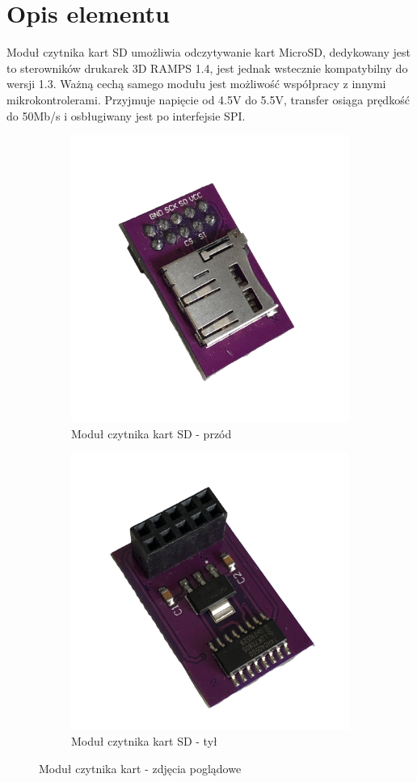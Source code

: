 \documentclass[11pt, a4paper]{article}
\author{Dawid Wasung}
\institute{Instytut Robotyki i Inteligencji Maszynowej}
\begin{document}
\newpage

\section*{Opis elementu} 
Moduł czytnika kart SD umożliwia odczytywanie kart MicroSD, dedykowany jest to sterowników drukarek 3D RAMPS 1.4, jest jednak wstecznie kompatybilny do wersji 1.3. Ważną cechą samego modułu jest możliwość współpracy z innymi mikrokontrolerami. Przyjmuje napięcie od 4.5V do 5.5V, transfer osiąga prędkość do 50Mb/s i osbługiwany jest po interfejsie SPI.
\vspace{0.5cm}
\begin{figure}[h!]
\centering
\begin{subfigure}{.5\textwidth}
  \centering
  \includegraphics[width=.72\linewidth]{fig/KY-018/zdj_modułu/front.png}
  \caption{Moduł czytnika kart SD - przód}
  \label{fig:sub1}
\end{subfigure}%
\begin{subfigure}{.5\textwidth}
  \centering
  \includegraphics[width=0.748\linewidth]{fig/KY-018/zdj_modułu/back.png}
  \caption{Moduł czytnika kart SD - tył}
  \label{fig:sub2}
\end{subfigure}
\caption{Moduł czytnika kart - zdjęcia poglądowe}
\label{fig:test}
\end{figure}
\end{document}
